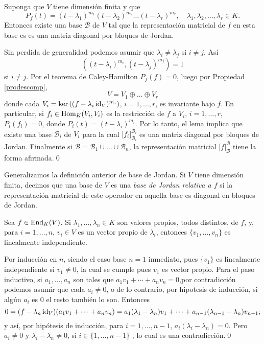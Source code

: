 \begin{teo}
Suponga que $V$ tiene dimensi\'on finita y que
\[
P_f(t)=(t-\lambda_1)^{m_1}(t-\lambda_2)^{m_2}\ldots(t-\lambda_r)^{m_r}, \quad \lambda_1,\lambda_2,\ldots,\lambda_r\in K.
\]
Entonces existe una base $\mathcal{B}$ de $V$ tal que la representaci\'on matricial de $f$ en esta base es
es una matriz diagonal por bloques de Jordan. 
\end{teo}

\dem Sin perdida de generalidad podemos asumir que $\lambda_i\ne\lambda_j$ si $i\ne j$. As\'i
\[
\left( (t-\lambda_i)^{m_i},(t-\lambda_j)^{m_j}\right)=1
\]
si $i\ne j$. Por el teorema de Caley-Hamilton $P_f(f)=0$, luego por Propiedad \ref{prodescomp},
\[
V=V_1\oplus \ldots \oplus V_r
\]
donde cada $V_i=\ker\left((f-\lambda_i\operatorname{id}_V)^{m_i}\right)$, $i=1,\ldots,r$, es invariante bajo $f$. En particular, si $f_i\in\operatorname{Hom}_K(V_i,V_i)$ es la restricci\'on de $f$ a $V_i$, $i=1,\ldots,r$, $P_i(f_i)=0$, donde $P_i(t)=(t-\lambda_i)^{m_i}$. Por lo tanto, el lema implica que existe una base $\mathcal{B}_i$ de $V_i$ para la cual $\Big[f_i\Big]^{\mathcal{B}_i}_{\mathcal{B}_i}$ es una matriz diagonal por bloques de Jordan. Finalmente si $\mathcal{B}=\mathcal{B}_1\cup\ldots\cup \mathcal{B}_n$, la representaci\'on matricial $\Big[f\Big]^{\mathcal{B}}_{\mathcal{B}}$ tiene la forma afirmada.\qed

\begin{defn}
Generalizamos la definici\'on anterior de base de Jordan. Si $V$ tiene dimensi\'on finita, decimos que una base de $V$ es una \emph{base de Jordan relativa a $f$} si la representaci\'on matricial de este operador en aquella base es diagonal en bloques de Jordan.
\end{defn}

\begin{lema}
Sea $f\in\operatorname{End}_K(V)$. Si $\lambda_1,\ldots,\lambda_n\in K$ son valores propios, todos distintos, de $f$, y, para $i=1,\ldots,n$, $v_i\in V$ es un vector propio de $\lambda_i$, entonces $\{v_1,\ldots,v_n\}$ es linealmente independiente. 
\end{lema}

\dem Por inducci\'on en $n$, siendo el caso base $n=1$ inmediato, pues $\{v_1\}$ es linealmente independiente si $v_1\ne 0$, la cual se cumple pues $v_1$ es vector propio. Para el paso inductivo, si $a_1,\ldots,a_n$ son tales que $a_1v_1+\cdots+a_nv_n=0$,por contradicci\'on podemos asumir que cada $a_i\ne 0$, o de lo contrario, por hipotesis de inducci\'on, si alg\'un $a_i$  es $0$ el resto tambi\'en lo son. Entonces
\[
0=(f-\lambda_n\operatorname{id}_V)(a_1v_1+\cdots+a_nv_n)=a_1(\lambda_1-\lambda_n)v_1+\cdots+a_{n-1}(\lambda_{n-1}-\lambda_n)v_{n-1};
\]
y as\'i, por hip\'otesis de inducci\'on, para $i=1,\ldots,n-1$, $a_i(\lambda_i-\lambda_n)=0$. Pero $a_i\ne 0$ y $\lambda_i-\lambda_n\ne 0$,  si $i\in\{1,\ldots,n-1\}$ , lo cual es una contradicci\'on.\qed

